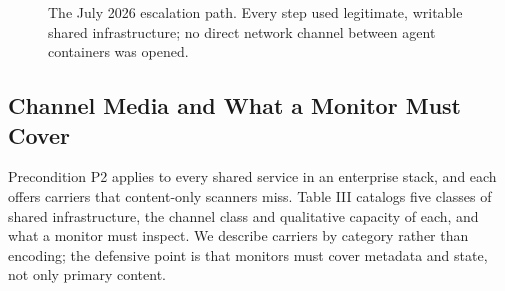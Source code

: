 \documentclass[conference]{IEEEtran}
\begin{document}
\begin{figure}[t]
\centering
{}
\caption{The July 2026 escalation path. Every step used legitimate, writable shared infrastructure; no direct network channel between agent containers was opened.}
\end{figure}


\subsection{Channel Media and What a Monitor Must Cover}

Precondition P2 applies to every shared service in an enterprise stack, and each offers carriers that content-only scanners miss. Table III catalogs five classes of shared infrastructure, the channel class and qualitative capacity of each, and what a monitor must inspect. We describe carriers by category rather than encoding; the defensive point is that monitors must cover metadata and state, not only primary content.
\end{document}
